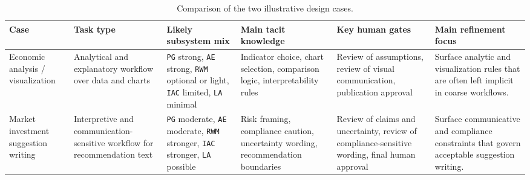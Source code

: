 \begin{table}[htbp]
\centering
\caption{Comparison of the two illustrative design cases.}
\begin{tabular}{p{3.2cm} p{3.2cm} p{4.2cm} p{4.6cm} p{4.2cm} p{4.6cm}}
\hline
\textbf{Case} & \textbf{Task type} & \textbf{Likely subsystem mix} & \textbf{Main tacit knowledge} & \textbf{Key human gates} & \textbf{Main refinement focus} \\
\hline
Economic analysis / visualization & Analytical and explanatory workflow over data and charts & \texttt{PG} strong, \texttt{AE} strong, \texttt{RWM} optional or light, \texttt{IAC} limited, \texttt{LA} minimal & Indicator choice, chart selection, comparison logic, interpretability rules & Review of assumptions, review of visual communication, publication approval & Surface analytic and visualization rules that are often left implicit in coarse workflows. \\
Market investment suggestion writing & Interpretive and communication-sensitive workflow for recommendation text & \texttt{PG} moderate, \texttt{AE} moderate, \texttt{RWM} stronger, \texttt{IAC} stronger, \texttt{LA} possible & Risk framing, compliance caution, uncertainty wording, recommendation boundaries & Review of claims and uncertainty, review of compliance-sensitive wording, final human approval & Surface communicative and compliance constraints that govern acceptable suggestion writing. \\
\hline
\end{tabular}
\end{table}
